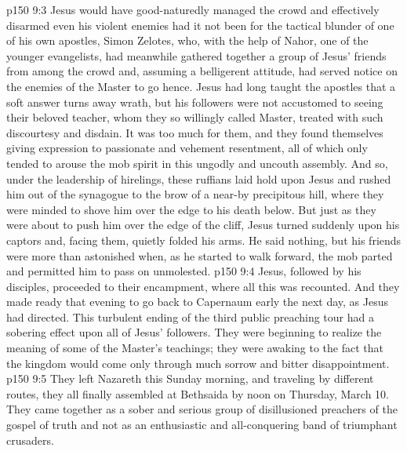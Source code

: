 \vs p150 9:3 Jesus would have good\hyp{}naturedly managed the crowd and effectively disarmed even his violent enemies had it not been for the tactical blunder of one of his own apostles, Simon Zelotes, who, with the help of Nahor, one of the younger evangelists, had meanwhile gathered together a group of Jesus’ friends from among the crowd and, assuming a belligerent attitude, had served notice on the enemies of the Master to go hence. Jesus had long taught the apostles that a soft answer turns away wrath, but his followers were not accustomed to seeing their beloved teacher, whom they so willingly called Master, treated with such discourtesy and disdain. It was too much for them, and they found themselves giving expression to passionate and vehement resentment, all of which only tended to arouse the mob spirit in this ungodly and uncouth assembly. And so, under the leadership of hirelings, these ruffians laid hold upon Jesus and rushed him out of the synagogue to the brow of a near\hyp{}by precipitous hill, where they were minded to shove him over the edge to his death below. But just as they were about to push him over the edge of the cliff, Jesus turned suddenly upon his captors and, facing them, quietly folded his arms. He said nothing, but his friends were more than astonished when, as he started to walk forward, the mob parted and permitted him to pass on unmolested.
\vs p150 9:4 Jesus, followed by his disciples, proceeded to their encampment, where all this was recounted. And they made ready that evening to go back to Capernaum early the next day, as Jesus had directed. This turbulent ending of the third public preaching tour had a sobering effect upon all of Jesus’ followers. They were beginning to realize the meaning of some of the Master’s teachings; they were awaking to the fact that the kingdom would come only through much sorrow and bitter disappointment.
\vs p150 9:5 They left Nazareth this Sunday morning, and traveling by different routes, they all finally assembled at Bethsaida by noon on Thursday, March 10. They came together as a sober and serious group of disillusioned preachers of the gospel of truth and not as an enthusiastic and all\hyp{}conquering band of triumphant crusaders.
